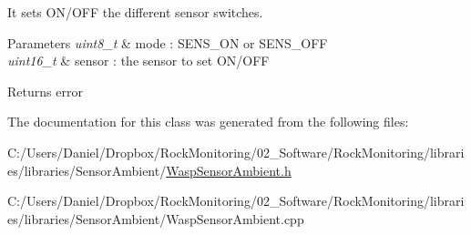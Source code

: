 It sets O\+N/\+O\+FF the different sensor switches. 


\begin{DoxyParams}{Parameters}
{\em uint8\+\_\+t} & mode \+: S\+E\+N\+S\+\_\+\+ON or S\+E\+N\+S\+\_\+\+O\+FF \\
\hline
{\em uint16\+\_\+t} & sensor \+: the sensor to set O\+N/\+O\+FF \\
\hline
\end{DoxyParams}
\begin{DoxyReturn}{Returns}
error 
\end{DoxyReturn}


The documentation for this class was generated from the following files\+:\begin{DoxyCompactItemize}
\item 
C\+:/\+Users/\+Daniel/\+Dropbox/\+Rock\+Monitoring/02\+\_\+\+Software/\+Rock\+Monitoring/libraries/libraries/\+Sensor\+Ambient/\hyperlink{_wasp_sensor_ambient_8h}{Wasp\+Sensor\+Ambient.\+h}\item 
C\+:/\+Users/\+Daniel/\+Dropbox/\+Rock\+Monitoring/02\+\_\+\+Software/\+Rock\+Monitoring/libraries/libraries/\+Sensor\+Ambient/Wasp\+Sensor\+Ambient.\+cpp\end{DoxyCompactItemize}
